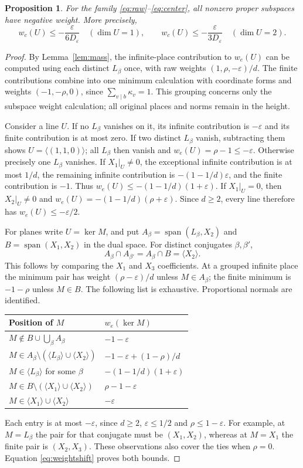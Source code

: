 \documentclass[11pt]{article}
\numberwithin{equation}{section}
\newtheorem{proposition}[theorem]{Proposition}
\theoremstyle{remark}\newtheorem{remark}[theorem]{Remark}
\newcommand{\eps}{\varepsilon}\newcommand{\LL}{\mathcal L}
\DeclareMathOperator{\spanop}{span}
\begin{document}
\begin{proposition}\label{prop:stable}
For the family \eqref{eq:raw}--\eqref{eq:center}, all nonzero proper
subspaces have negative weight. More precisely,
\[
 w_c(U)\le-\frac{\eps}{6D_\eps}\quad(\dim U=1),\qquad
 w_c(U)\le-\frac{\eps}{3D_\eps}\quad(\dim U=2).
\]
\end{proposition}
\begin{proof}
By Lemma~\ref{lem:mass}, the infinite-place contribution to $w_e(U)$
can be computed using each distinct $L_\beta$ once, with raw weights
$(1,\rho,-\eps)/d$. The finite contributions combine into one minimum
calculation with coordinate forms and weights $(-1,-\rho,0)$, since
$\sum_{v\mid b}\kappa_v=1$. This grouping concerns only the subspace
weight calculation; all original places and norms remain in the height.

Consider a line $U$. If no $L_\beta$ vanishes on it, its infinite
contribution is $-\eps$ and its finite contribution is at most zero.
If two distinct $L_\beta$ vanish, subtracting them shows
$U=\langle(1,1,0)\rangle$; all $L_\beta$ then vanish and
$w_e(U)=\rho-1\le-\eps$.
Otherwise precisely one $L_\beta$ vanishes. If $X_1|_U\ne0$, the
exceptional infinite contribution is at most $1/d$, the remaining
infinite contribution is $-(1-1/d)\eps$, and the finite contribution
is $-1$. Thus $w_e(U)\le-(1-1/d)(1+\eps)$.
If $X_1|_U=0$, then $X_2|_U\ne0$ and
$w_e(U)=-(1-1/d)(\rho+\eps)$.
Since $d\ge2$, every line therefore has $w_e(U)\le-\eps/2$.

For planes write $U=\ker M$, and put
$A_\beta=\spanop(L_\beta,X_2)$ and $B=\spanop(X_1,X_2)$ in the dual
space. For distinct conjugates $\beta,\beta'$,
\[
 A_\beta\cap A_{\beta'}=A_\beta\cap B=\langle X_2\rangle.
\]
This follows by comparing the $X_1$ and $X_3$ coefficients.
At a grouped infinite place the minimum pair has weight
$(\rho-\eps)/d$ unless $M\in A_\beta$; the finite minimum is
$-1-\rho$ unless $M\in B$.
The following list is exhaustive. Proportional normals are identified.
\begin{center}\small
\begin{tabular}{@{}ll@{}}\toprule
Position of $M$ & $w_e(\ker M)$\\\midrule
$M\notin B\cup\bigcup_\beta A_\beta$ & $-1-\eps$\\
$M\in A_\beta\setminus(\langle L_\beta\rangle\cup\langle X_2\rangle)$
 & $-1-\eps+(1-\rho)/d$\\
$M\in\langle L_\beta\rangle$ for some $\beta$ & $-(1-1/d)(1+\eps)$\\
$M\in B\setminus(\langle X_1\rangle\cup\langle X_2\rangle)$ & $\rho-1-\eps$\\
$M\in\langle X_1\rangle\cup\langle X_2\rangle$ & $-\eps$\\\bottomrule
\end{tabular}
\end{center}
Each entry is at most $-\eps$, since $d\ge2$, $\eps\le1/2$ and
$\rho\le1-\eps$.
For example, at $M=L_\beta$ the pair for that conjugate must be
$(X_1,X_2)$, whereas at $M=X_1$ the finite pair is $(X_2,X_3)$.
These observations also cover the ties when $\rho=0$.
Equation \eqref{eq:weightshift} proves both bounds.
\end{proof}
\end{document}
